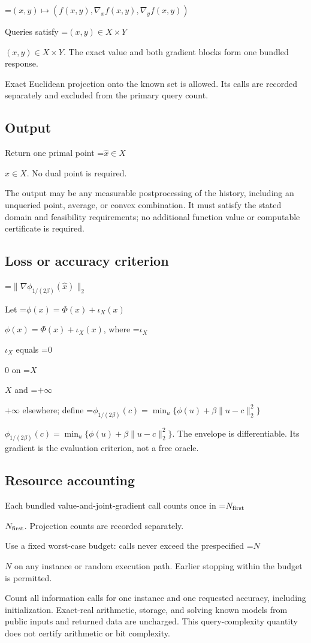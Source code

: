 \documentclass[10pt,a4paper]{article}
\newcommand{\AtlasMath}[1]{\par\begingroup\centering\setbox0=\hbox{$\displaystyle #1$}\ifdim\wd0>1.4\linewidth\typeout{ATLAS WIDE FORMULA: \the\wd0}\fi\ifdim\wd0>\linewidth\resizebox{\linewidth}{!}{\box0}\else\box0\fi\par\endgroup}
\newcommand{\AtlasInlineMath}[1]{\begingroup\setbox0=\hbox{$#1$}\ifdim\wd0>.4\linewidth\endgroup\AtlasMath{#1}\else\endgroup$#1$\fi}
\begin{document}
\AtlasMath{(x,y)\longmapsto(f(x,y),\nabla_xf(x,y),\nabla_yf(x,y))}


Queries satisfy \AtlasInlineMath{(x,y)\in X\times Y}. The exact value and both gradient blocks form one bundled response.

Exact Euclidean projection onto the known set is allowed. Its calls are recorded separately and excluded from the primary query count.

\subsection{Output}
Return one primal point \AtlasInlineMath{\widehat x\in X}. No dual point is required.

The output may be any measurable postprocessing of the history, including an unqueried point, average, or convex combination. It must satisfy the stated domain and feasibility requirements; no additional function value or computable certificate is required.

\subsection{Loss or accuracy criterion}

\AtlasMath{\|\nabla\phi_{1/(2\beta)}(\widehat{x})\|_2}


Let \AtlasInlineMath{\phi(x)=\Phi(x)+\iota_X(x)}, where \AtlasInlineMath{\iota_X} equals \AtlasInlineMath{0} on \AtlasInlineMath{X} and \AtlasInlineMath{+\infty} elsewhere; define \AtlasInlineMath{\phi_{1/(2\beta)}(c)=\min_u\{\phi(u)+\beta\|u-c\|_2^2\}}. The envelope is differentiable. Its gradient is the evaluation criterion, not a free oracle.

\subsection{Resource accounting}
Each bundled value-and-joint-gradient call counts once in \AtlasInlineMath{N_{\rm first}}. Projection counts are recorded separately.

Use a fixed worst-case budget: calls never exceed the prespecified \AtlasInlineMath{N} on any instance or random execution path. Earlier stopping within the budget is permitted.

Count all information calls for one instance and one requested accuracy, including initialization. Exact-real arithmetic, storage, and solving known models from public inputs and returned data are uncharged. This query-complexity quantity does not certify arithmetic or bit complexity.
\end{document}
